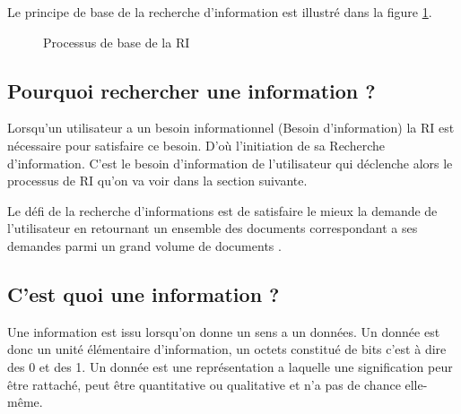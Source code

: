 Le principe de base de la recherche d'information est illustré dans la figure \ref{processus-ri}.

\begin{figure}[htbp]
    \begin{center}
        \caption{Processus de base de la RI \citep{amelioration-ri-approche-semantique}}
    \end{center}
    \label{processus-ri}
\end{figure}

\subsection{Pourquoi rechercher une information ?}
Lorsqu'un utilisateur a un besoin informationnel (Besoin d'information) la RI est nécessaire pour satisfaire ce besoin. D'où l'initiation de sa Recherche d'information. C'est le besoin d'information de l'utilisateur qui déclenche alors le processus de RI qu'on va voir dans la section suivante.

Le défi de la recherche d'informations est de satisfaire le mieux la demande de l'utilisateur en retournant un ensemble des documents correspondant a ses demandes parmi un grand volume de documents \citep{amelioration-ri-approche-semantique}.

\subsection{C'est quoi une information ?}
Une information est issu lorsqu'on donne un sens a un données. Un donnée est donc un unité élémentaire d'information, un octets constitué de bits c'est à dire des 0 et des 1. Un donnée est une représentation a laquelle une signification peur être rattaché, peut être quantitative ou qualitative et n'a pas de chance elle-même.

